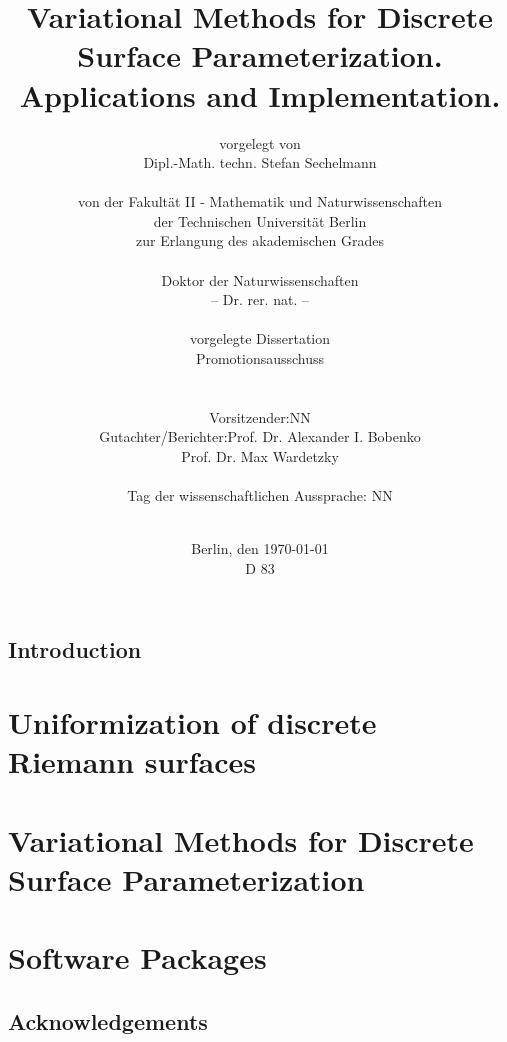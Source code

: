 \documentclass[a4paper]{book}
\title{Variational Methods for Discrete Surface Parameterization. Applications and Implementation.}
\author{
vorgelegt von\\
Dipl.-Math. techn. Stefan Sechelmann\\
\vspace{0.3cm}\\
von der Fakult{\"a}t II - Mathematik und Naturwissenschaften\\
der Technischen Universit{\"a}t Berlin\\
zur Erlangung des akademischen Grades\\
\vspace{0.3cm}\\
Doktor der Naturwissenschaften\\
-- Dr. rer. nat. --\\
\vspace{0.3cm}\\
vorgelegte Dissertation
\vspace{1.5cm}\\
Promotionsausschuss\\
\vspace{0.3cm}\\
\begin{tabular}{rl}
Vorsitzender: & NN \\
Gutachter/Berichter: & Prof. Dr. Alexander I. Bobenko \\
& Prof. Dr. Max Wardetzky 
\end{tabular}
\vspace{0.3cm}\\
Tag der wissenschaftlichen Aussprache: NN\\
\vspace{1cm}\\
}
\date{
	Berlin, den {\selectlanguage{german}\today}\\
	\vspace{0.3cm}
	D 83
}
\begin{document}

\frontmatter
\maketitle
\newpage

\tableofcontents
\newpage
\listoffigures

\newpage
\mainmatter
\setcounter{secnumdepth}{-1} 
\chapter{Introduction}
\setcounter{secnumdepth}{2} 
\part{Uniformization of discrete Riemann surfaces}

\part{Variational Methods for Discrete Surface Parameterization}
%
%
%
\part{Software Packages}
%
%
%
%

\newpage
\backmatter 

\setcounter{secnumdepth}{-1} 


\chapter{Acknowledgements}
\end{document}
